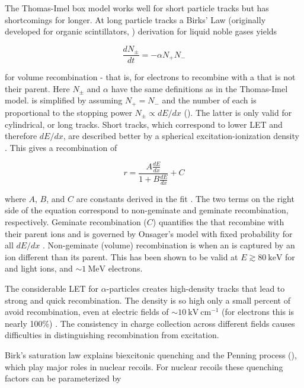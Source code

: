 The Thomas-Imel box model works well for short particle tracks but has shortcomings for longer.  At long particle tracks a Birks'
Law (originally developed for organic scintillators, ) derivation for liquid noble gases yields

\begin{equation}
\frac{dN_{\pm}}{dt} = -\alpha N_{+} N_{-}
\label{eq:birks_diff}
\end{equation}

\noindent for volume recombination - that is, for electrons to recombine with a  that is not their parent.  Here $N_{\pm}$ and
$\alpha$ have the same definitions as in the Thomas-Imel model.   is simplified by assuming
$N_{+} = N_{-}$ and the number of each is proportional to the stopping power $N_{\pm} \propto dE/dx$
().  The latter is only valid for
cylindrical, or long tracks.  Short tracks, which correspond to lower LET and therefore $dE/dx$, are described better by a spherical
excitation-ionization density .  This gives a recombination of

\begin{equation}
r = \frac{A \frac{dE}{dx}}{1 + B \frac{dE}{dx}} + C
\label{eq:birks_recomb}
\end{equation}

\noindent where $A$, $B$, and $C$ are constants derived in the fit .  The two terms on the right side of the equation
correspond to
non-geminate and geminate recombination, respectively.  Geminate recombination ($C$) quantifies the
\electron that recombine with their parent ions and is governed by Onsager's model with fixed probability for all $dE/dx$
.  Non-geminate
(volume) recombination is when an \electron is captured by an ion different than its parent.  This has been shown to be valid at
$E \gtrsim 80\ \mathrm{keV}$ for \gammarays and light ions, and ${\sim} 1\ \mathrm{MeV}$ electrons.

The considerable LET for $\alpha$-particles creates high-density tracks that lead to strong and quick recombination.  The
density is so high only a small percent of \electron avoid recombination, even at electric fields of
${\sim} 10\ \mathrm{kV\ cm^{-1}}$
(for electrons this is nearly 100\%) .  The consistency in charge collection across different fields causes
difficulties in distinguishing recombination from excitation.

Birk's saturation law explains biexcitonic quenching and the Penning process (), which play major roles in nuclear
recoils.  For nuclear recoils these quenching factors can be parameterized by

